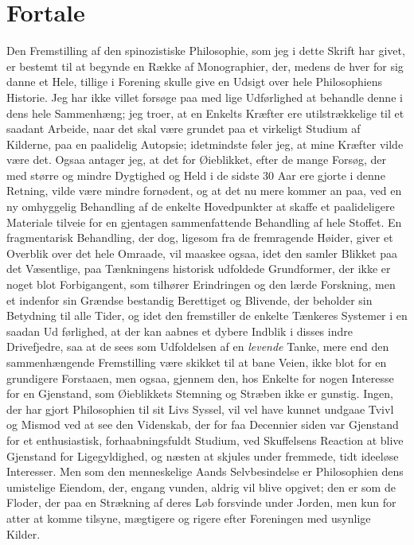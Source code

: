 \documentclass[12pt,a4paper]{book}
\newcommand{\opage}[1]{\marginnote{\footnotesize\textit{[#1]}}}
\begin{document}
\chapter*{Fortale}

\opage{1} %
Den Fremstilling af den spinozistiske Philosophie, som jeg i
dette Skrift har givet, er bestemt til at begynde en Række af
Monographier, der, medens de hver for sig danne et Hele, tillige i
Forening skulle give en Udsigt over hele Philosophiens Historie. Jeg
har ikke villet forsøge paa med lige Udførlighed at behandle denne i
dens hele Sammenhæng; jeg troer, at en Enkelts Kræfter ere
utilstrækkelige til et saadant Arbeide, naar det skal være grundet paa
et virkeligt Studium af Kilderne, paa en paalidelig Autopsie;
idetmindste føler jeg, at mine Kræfter vilde være det. Ogsaa antager
jeg, at det for Øieblikket, efter de mange Forsøg, der med større og
mindre Dygtighed og Held i de sidste 30 Aar ere gjorte i denne
Retning, vilde være mindre fornødent, og at det nu mere kommer an
paa, ved en ny omhyggelig Behandling af de enkelte Hovedpunkter at
skaffe et paalideligere Materiale tilveie for en gjentagen
sammenfattende Behandling af hele Stoffet. En fragmentarisk Behandling,
der dog, ligesom fra de fremragende Høider, giver et Overblik over det
hele Omraade, vil maaskee ogsaa, idet den samler Blikket paa det
Væsentlige, paa Tænkningens historisk udfoldede Grundformer, der ikke
er noget blot Forbigangent, som tilhører Erindringen og den lærde
Forskning, men et indenfor sin Grændse bestandig Berettiget og
Blivende, der beholder sin Betydning til alle Tider, og idet den
fremstiller de enkelte Tænkeres Systemer i en saadan Ud\-%
\opage{2}førlighed, at der kan aabnes et dybere Indblik i disses indre
Drivefjedre, saa at de sees som Udfoldelsen af en \emph{levende}
Tanke, mere end den sammenhængende Fremstilling være skikket til at
bane Veien, ikke blot for en grundigere Forstaaen, men ogsaa, gjennem
den, hos Enkelte for nogen Interesse for en Gjenstand, som Øieblikkets
Stemning og Stræben ikke er gunstig. Ingen, der har gjort Philosophien
til sit Livs Syssel, vil vel have kunnet undgaae Tvivl og Mismod ved
at see den Videnskab, der for faa Decennier siden var Gjenstand for et
enthusiastisk, forhaabningsfuldt Studium, ved Skuffelsens Reaction at
blive Gjenstand for Ligegyldighed, og næsten at skjules under
fremmede, tidt ideeløse Interesser. Men som den menneskelige Aands
Selvbesindelse er Philosophien dens umistelige Eiendom, der, engang
vunden, aldrig vil blive opgivet; den er som de Floder, der paa en
Strækning af deres Løb forsvinde under Jorden, men kun for atter at
komme tilsyne, mægtigere og rigere efter Foreningen med usynlige
Kilder.
\end{document}
